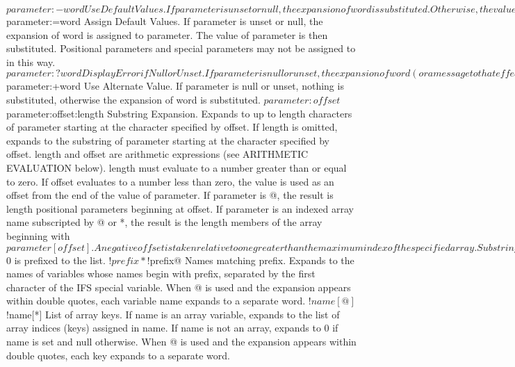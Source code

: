\documentclass[11pt]{article}
\begin{document}
{${parameter:-word}
Use Default Values. If parameter is unset or null, the expansion of word is substituted. Otherwise, the value of parameter is substituted.
${parameter:=word}
Assign Default Values. If parameter is unset or null, the expansion of word is assigned to parameter. The value of parameter is then substituted. Positional parameters and special parameters may not be assigned to in this way.
${parameter:?word}
Display Error if Null or Unset. If parameter is null or unset, the expansion of word (or a message to that effect if word is not present) is written to the standard error and the shell, if it is not interactive, exits. Otherwise, the value of parameter is substituted.
${parameter:+word}
Use Alternate Value. If parameter is null or unset, nothing is substituted, otherwise the expansion of word is substituted.
${parameter:offset}
${parameter:offset:length}
Substring Expansion. Expands to up to length characters of parameter starting at the character specified by offset. If length is omitted, expands to the substring of parameter starting at the character specified by offset. length and offset are arithmetic expressions (see ARITHMETIC EVALUATION below). length must evaluate to a number greater than or equal to zero. If offset evaluates to a number less than zero, the value is used as an offset from the end of the value of parameter. If parameter is @, the result is length positional parameters beginning at offset. If parameter is an indexed array name subscripted by @ or *, the result is the length members of the array beginning with ${parameter[offset]}. A negative offset is taken relative to one greater than the maximum index of the specified array. Substring expansion applied to an associative array produces undefined results. Note that a negative offset must be separated from the colon by at least one space to avoid being confused with the :- expansion. Substring indexing is zero-based unless the positional parameters are used, in which case the indexing starts at 1 by default. If offset is 0, and the positional parameters are used, $0 is prefixed to the list.
${!prefix*}
${!prefix@}
Names matching prefix. Expands to the names of variables whose names begin with prefix, separated by the first character of the IFS special variable. When @ is used and the expansion appears within double quotes, each variable name expands to a separate word.
${!name[@]}
${!name[*]}
List of array keys. If name is an array variable, expands to the list of array indices (keys) assigned in name. If name is not an array, expands to 0 if name is set and null otherwise. When @ is used and the expansion appears within double quotes, each key expands to a separate word.
}
\end{document}
